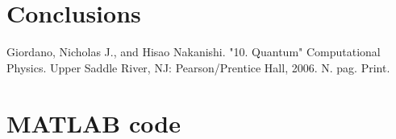 \documentclass[12pt]{article}                  %
\begin{document}
\section{Conclusions}



\begin{thebibliography}{9}

Giordano, Nicholas J., and Hisao Nakanishi. "10. Quantum" Computational Physics. Upper Saddle River, NJ: Pearson/Prentice Hall, 2006. N. pag. Print.


\end{thebibliography}

\pagebreak
\section{MATLAB code}
\end{document}
